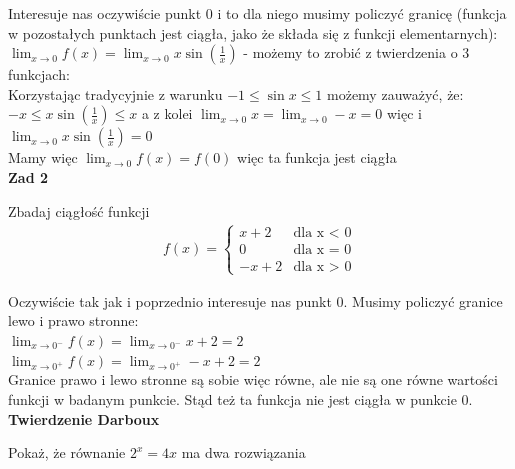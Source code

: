 \documentclass[12pt]{article}
\begin{document}
    \noindent Interesuje nas oczywiście punkt 0 i to dla niego musimy policzyć granicę (funkcja w pozostałych punktach jest ciągła, jako że składa się z funkcji elementarnych): \\

    \noindent $\lim_{x \to 0} f(x) = \lim_{x \to 0} x \sin(\frac{1}{x})$ - możemy to zrobić z twierdzenia o 3 funkcjach: \\

    \noindent Korzystając tradycyjnie z warunku $-1 \leq \sin{x} \leq 1$ możemy zauważyć, że: \\

    \noindent $-x \leq x \sin(\frac{1}{x}) \leq x$ a z kolei $\lim_{x \to 0} x = \lim_{x \to 0} -x = 0$ więc i $\lim_{x \to 0} x \sin(\frac{1}{x}) = 0$ \\

    \noindent Mamy więc $\lim_{x \to 0} f(x) = f(0)$ więc ta funkcja jest ciągła \\


    \noindent \textbf{Zad 2}

    \begin{exercise}
		Zbadaj ciągłość funkcji \begin{align*}
         		f(x) =
              \begin{cases}
              x + 2 & \text{dla x $<$ 0} \\
              0 & \text{dla x = 0} \\
              -x + 2 & \text{dla x $>$ 0}
			\end{cases}
    		\end{align*}
	\end{exercise}

    \noindent Oczywiście tak jak i poprzednio interesuje nas punkt 0. Musimy policzyć granice lewo i prawo stronne: \\

    \noindent $\lim_{x \to 0^{-}} f(x) = \lim_{x \to 0^{-}} x + 2 = 2$ \\
    \noindent $\lim_{x \to 0^{+}} f(x) = \lim_{x \to 0^{+}} -x + 2 = 2$ \\

    \noindent Granice prawo i lewo stronne są sobie więc równe, ale nie są one równe wartości funkcji w badanym punkcie.
    Stąd też ta funkcja nie jest ciągła w punkcie 0. \\


    \noindent \textbf{Twierdzenie Darboux}

	\begin{exercise}
		Pokaż, że równanie $2^x = 4x$ ma dwa rozwiązania
	\end{exercise}
\end{document}
